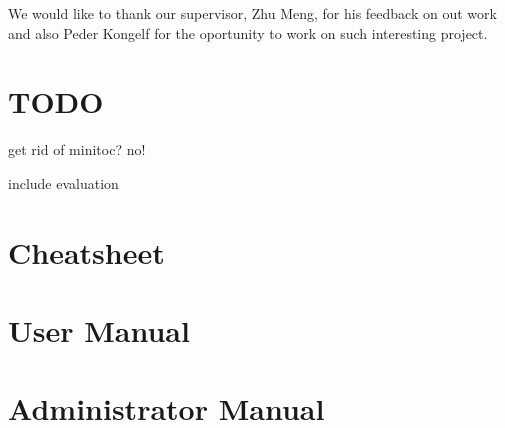 \documentclass[10pt,a4paper,oneside]{report}
\begin{document}
We would like to thank our supervisor, Zhu Meng, for his feedback on out work
and also Peder Kongelf for the oportunity to work on such interesting project. 


\chapter*{TODO}
get rid of minitoc? no!

include evaluation

\setcounter{tocdepth}{1}
\dominitoc
\dominilof
\dominilot
\tableofcontents
\clearpage
\listoffigures
\listoftables















\chapter{Cheatsheet}


\chapter{User Manual}


\chapter{Administrator Manual}




\end{document}
